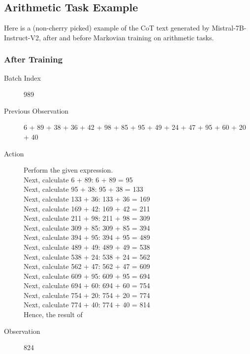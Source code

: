 \documentclass{article} %
\begin{document}
\subsection{Arithmetic Task Example}
Here is a (non-cherry picked) example of the CoT text generated by Mistral-7B-Instruct-V2, after and before Markovian training on arithmetic tasks.

\subsubsection{After Training}
\begin{description}
    \item[Batch Index] 989
    \item[Previous Observation] 6 + 89 + 38 + 36 + 42 + 98 + 85 + 95 + 49 + 24 + 47 + 95 + 60 + 20 + 40
    \item[Action] Perform the given expression.\\[1ex]
    Next, calculate 6 + 89: 6 + 89 = 95\\[1ex]
    Next, calculate 95 + 38: 95 + 38 = 133\\[1ex]
    Next, calculate 133 + 36: 133 + 36 = 169\\[1ex]
    Next, calculate 169 + 42: 169 + 42 = 211\\[1ex]
    Next, calculate 211 + 98: 211 + 98 = 309\\[1ex]
    Next, calculate 309 + 85: 309 + 85 = 394\\[1ex]
    Next, calculate 394 + 95: 394 + 95 = 489\\[1ex]
    Next, calculate 489 + 49: 489 + 49 = 538\\[1ex]
    Next, calculate 538 + 24: 538 + 24 = 562\\[1ex]
    Next, calculate 562 + 47: 562 + 47 = 609\\[1ex]
    Next, calculate 609 + 95: 609 + 95 = 694\\[1ex]
    Next, calculate 694 + 60: 694 + 60 = 754\\[1ex]
    Next, calculate 754 + 20: 754 + 20 = 774\\[1ex]
    Next, calculate 774 + 40: 774 + 40 = 814\\[1ex]
    Hence, the result of
    \item[Observation] 824
\end{description}
\end{document}
